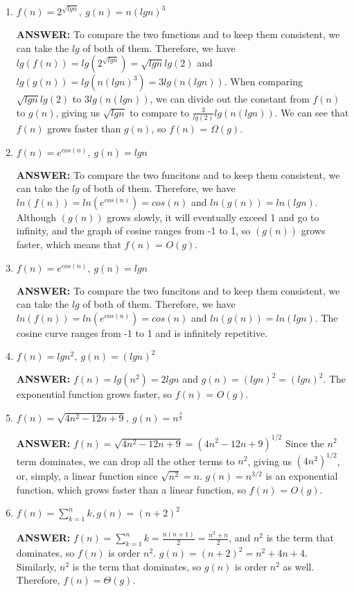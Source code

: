 \documentclass{article}
\begin{document}
\begin{enumerate}
\item $f(n) = 2^{\sqrt{lgn}},\ g(n) = n(lgn)^3$

{\bfseries ANSWER: }To compare the two functions and to keep them consistent, we can take the $lg$ of both of them. Therefore, we have $lg(f(n))=lg(2^{\sqrt{lgn}})=\sqrt{lgn}lg(2)$ and $lg(g(n))=lg(n(lgn)^3)=3lg(n(lgn))$. When comparing $\sqrt{lgn}lg(2)$ to $3lg(n(lgn))$, we can divide out the constant from $f(n)$ to $g(n)$, giving us $\sqrt{lgn}$ to compare to $\frac{3}{lg(2)}lg(n(lgn))$. We can see that $f(n)$ grows faster than $g(n)$, so $f(n)$ = $\Omega(g)$.

\item $f(n) = e^{cos(n)},\ g(n) = lgn$

{\bfseries ANSWER: }To compare the two funcitons and to keep them consistent, we can take the $lg$ of both of them. Therefore, we have $ln(f(n)) = ln(e^{cos(n)}) = cos(n)$ and $ln(g(n)) = ln(lgn)$. Although $(g(n))$ grows slowly, it will eventually exceed 1 and go to infinity, and the graph of cosine ranges from -1 to 1, so $(g(n))$ grows faster, which means that $f(n)$ = $O(g)$.


\item $f(n) = e^{cos(n)},\ g(n) = lgn$

{\bfseries ANSWER: }To compare the two funcitons and to keep them consistent, we can take the $lg$ of both of them. Therefore, we have $ln(f(n)) = ln(e^{cos(n)}) = cos(n)$ and $ln(g(n)) = ln(lgn)$. The cosine curve ranges from -1 to 1 and is infinitely repetitive. 

\item $f(n) = lgn^2,\ g(n) = (lgn)^2$

{\bfseries ANSWER: }$f(n)=lg(n^2)=2lgn$ and $g(n)=(lgn)^2=(lgn)^2$. The exponential function grows faster, so $f(n)$ = $O(g)$.

\item $f(n) = \sqrt{4n^2 - 12n + 9},\ g(n) = n^{\frac{3}{2}}$

{\bfseries ANSWER: }$f(n)=\sqrt{4n^2 - 12n + 9}=(4n^2-12n+9)^{1/2}$ Since the $n^2$ term dominates, we can drop all the other terms to $n^2$, giving us $(4n^2)^{1/2}$, or, simply, a linear function since $\sqrt{n^2}=n$. $g(n)=n^{3/2}$ is an exponential function, which grows faster than a linear function, so $f(n)$ = $O(g)$.

\item $f(n) = \sum_{k=1}^{n} k, g(n) = (n+2)^2$

{\bfseries ANSWER: }$f(n) = \sum_{k=1}^{n} k=\frac{n(n+1)}{2}=\frac{n^2+n}{2}$, and $n^2$ is the term that dominates, so $f(n)$ is order $n^2$. $g(n)=(n+2)^2=n^2+4n+4$. Similarly, $n^2$ is the term that dominates, so $g(n)$ is order $n^2$ as well. Therefore, $f(n)=\Theta(g)$.

\end{enumerate}
\end{document}
